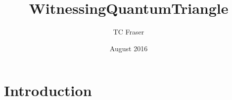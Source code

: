 \documentclass{article}
\title{WitnessingQuantumTriangle}
\author{TC Fraser}
\date{August 2016}
\begin{document}
\maketitle

\section{Introduction}
\end{document}
